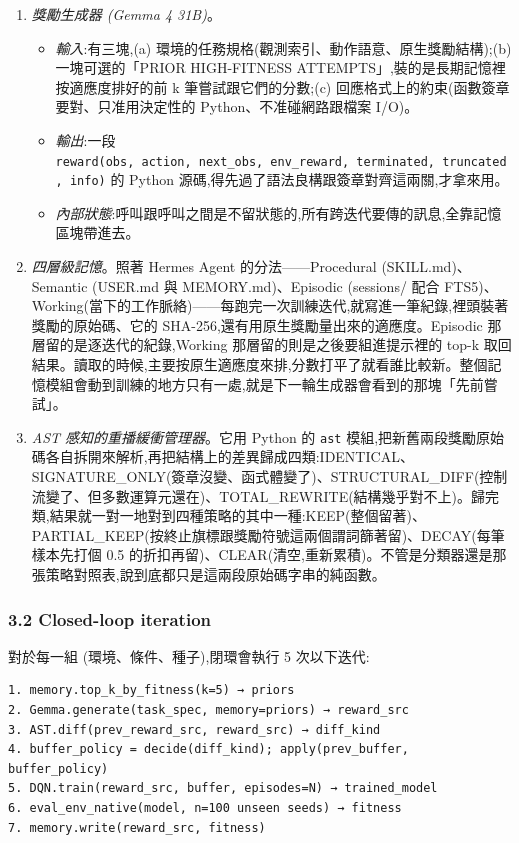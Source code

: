 \begin{enumerate}
\def\labelenumi{\arabic{enumi}.}
\item
  \emph{獎勵生成器 (Gemma 4 31B)}。

  \begin{itemize}
  \tightlist
  \item
    \emph{輸入}:有三塊,(a) 環境的任務規格(觀測索引、動作語意、原生獎勵結構);(b) 一塊可選的「PRIOR HIGH-FITNESS ATTEMPTS」,裝的是長期記憶裡按適應度排好的前 k 筆嘗試跟它們的分數;(c) 回應格式上的約束(函數簽章要對、只准用決定性的 Python、不准碰網路跟檔案 I/O)。
  \item
    \emph{輸出}:一段 \texttt{reward(obs,\ action,\ next\_obs,\ env\_reward,\ terminated,\ truncated,\ info)} 的 Python 源碼,得先過了語法良構跟簽章對齊這兩關,才拿來用。
  \item
    \emph{內部狀態}:呼叫跟呼叫之間是不留狀態的,所有跨迭代要傳的訊息,全靠記憶區塊帶進去。
  \end{itemize}
\item
  \emph{四層級記憶}。照著 Hermes Agent 的分法------Procedural (SKILL.md)、Semantic (USER.md 與 MEMORY.md)、Episodic (sessions/ 配合 FTS5)、Working(當下的工作脈絡)------每跑完一次訓練迭代,就寫進一筆紀錄,裡頭裝著獎勵的原始碼、它的 SHA-256,還有用原生獎勵量出來的適應度。Episodic 那層留的是逐迭代的紀錄,Working 那層留的則是之後要組進提示裡的 top-k 取回結果。讀取的時候,主要按原生適應度來排,分數打平了就看誰比較新。整個記憶模組會動到訓練的地方只有一處,就是下一輪生成器會看到的那塊「先前嘗試」。
\item
  \emph{AST 感知的重播緩衝管理器}。它用 Python 的 \texttt{ast} 模組,把新舊兩段獎勵原始碼各自拆開來解析,再把結構上的差異歸成四類:IDENTICAL、SIGNATURE\_ONLY(簽章沒變、函式體變了)、STRUCTURAL\_DIFF(控制流變了、但多數運算元還在)、TOTAL\_REWRITE(結構幾乎對不上)。歸完類,結果就一對一地對到四種策略的其中一種:KEEP(整個留著)、PARTIAL\_KEEP(按終止旗標跟獎勵符號這兩個謂詞篩著留)、DECAY(每筆樣本先打個 0.5 的折扣再留)、CLEAR(清空,重新累積)。不管是分類器還是那張策略對照表,說到底都只是這兩段原始碼字串的純函數。
\end{enumerate}

\subsubsection{3.2 Closed-loop iteration}\label{32-closed-loop-iteration}

對於每一組 (環境、條件、種子),閉環會執行 5 次以下迭代:

\begin{verbatim}
1. memory.top_k_by_fitness(k=5) → priors
2. Gemma.generate(task_spec, memory=priors) → reward_src
3. AST.diff(prev_reward_src, reward_src) → diff_kind
4. buffer_policy = decide(diff_kind); apply(prev_buffer, buffer_policy)
5. DQN.train(reward_src, buffer, episodes=N) → trained_model
6. eval_env_native(model, n=100 unseen seeds) → fitness
7. memory.write(reward_src, fitness)
\end{verbatim}

